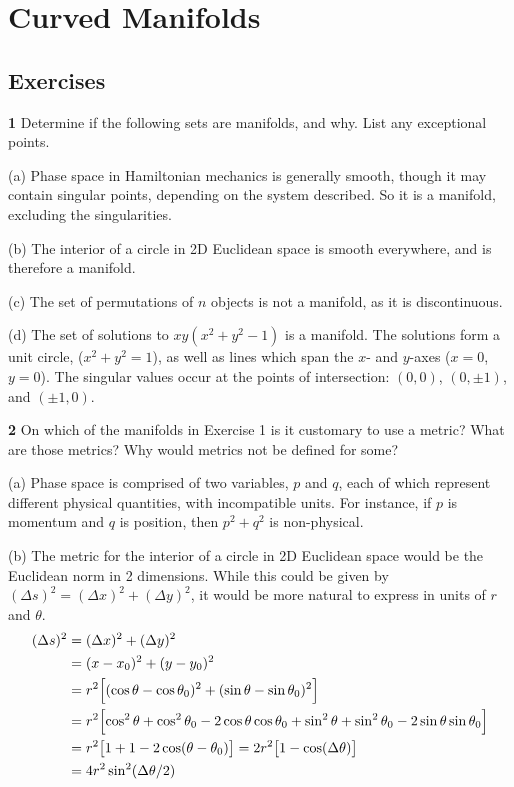 \documentclass[gr-notes.tex]{subfiles}
\begin{document}
\setcounter{chapter}{5}

\chapter{Curved Manifolds}

\setcounter{section}{8}

\section{Exercises}


\textbf{1}
Determine if the following sets are manifolds, and why. List any exceptional points.

(a) Phase space in Hamiltonian mechanics is generally smooth, though it may contain singular points, depending on the system described. So it is a manifold, excluding the singularities.

(b) The interior of a circle in 2D Euclidean space is smooth everywhere, and is therefore a manifold.

(c) The set of permutations of $n$ objects is not a manifold, as it is discontinuous.

(d) The set of solutions to $xy (x^2 + y^2 - 1)$ is a manifold. The solutions form a unit circle, ($x^2 + y^2 = 1$), as well as lines which span the $x$- and $y$-axes ($x=0$, $y=0$). The singular values occur at the points of intersection: $(0, 0)$, $(0, \pm1)$, and $(\pm1, 0)$.


\textbf{2}
On which of the manifolds in Exercise 1 is it customary to use a metric? What are those metrics? Why would metrics not be defined for some?

(a) Phase space is comprised of two variables, $p$ and $q$, each of which represent different physical quantities, with incompatible units. For instance, if $p$ is momentum and $q$ is position, then $p^2 + q^2$ is non-physical.

(b) The metric for the interior of a circle in 2D Euclidean space would be the Euclidean norm in 2 dimensions. While this could be given by $(\Delta s)^2 = (\Delta x)^2 + (\Delta y)^2$, it would be more natural to express in units of $r$ and $\theta$.
%
\begin{align*}
  (\Delta s)^2 &=
  (\Delta x)^2 + (\Delta y)^2
  \\ &=
  (x - x_0)^2 + (y - y_0)^2
  \\ &=
  r^2 \qty[ (\cos\theta - \cos\theta_0)^2 + (\sin\theta - \sin\theta_0)^2 ]
  \\ &=
  r^2 \qty[
    \cos^2\theta + \cos^2\theta_0 - 2 \cos\theta \cos\theta_0 +
    \sin^2\theta + \sin^2\theta_0 - 2 \sin\theta \sin\theta_0
  ]
  \\ &=
  r^2 \qty[ 1 + 1 - 2 \cos(\theta - \theta_0) ] =
  2 r^2 \qty[ 1 - \cos(\Delta\theta) ]
  \\ &=
  4 r^2 \sin^2(\Delta\theta / 2)
\end{align*}
\end{document}
